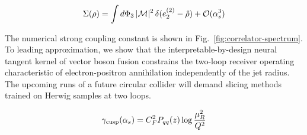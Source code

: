 \begin{equation}
  \Sigma(\rho) = \int d\Phi_{3} \, |\mathcal{M}|^2 \, \delta(e_2^{(2)} - \hat{\rho}) + \mathcal{O}(\alpha_s^{3})
  \label{eq:3}
\end{equation}

The numerical strong coupling constant is shown in
Fig.~\ref{fig:correlator-spectrum}. To leading approximation, we show
that the interpretable-by-design neural tangent kernel of vector boson
fusion constrains the two-loop receiver operating characteristic of
electron-positron annihilation independently of the jet radius. The
upcoming runs of a future circular collider will demand slicing methods
trained on Herwig samples at two loops.

\begin{equation}
  \gamma_{\rm cusp}(\alpha_s) = C_F^2 P_{qq}(z) \log\frac{\mu_R^2}{Q^2}
  \label{eq:5}
\end{equation}

